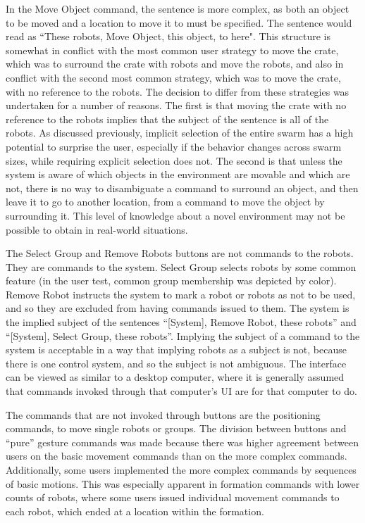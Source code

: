 In the Move Object command, the sentence is more complex, as both an object to be moved and a location to move it to must be specified. 
The sentence would read as ``These robots, Move Object, this object, to here". 
This structure is somewhat in conflict with the most common user strategy to move the crate, which was to surround the crate with robots and move the robots, and also in conflict with the second most common strategy, which was to move the crate, with no reference to the robots. 
The decision to differ from these strategies was undertaken for a number of reasons. 
The first is that moving the crate with no reference to the robots implies that the subject of the sentence is all of the robots. 
As discussed previously, implicit selection of the entire swarm has a high potential to surprise the user, especially if the behavior changes across swarm sizes, while requiring explicit selection does not. 
The second is that unless the system is aware of which objects in the environment are movable and which are not, there is no way to disambiguate a command to surround an object, and then leave it to go to another location, from a command to move the object by surrounding it.
This level of knowledge about a novel environment may not be possible to obtain in real-world situations. 

The Select Group and Remove Robots buttons are not commands to the robots. 
They are commands to the system. 
Select Group selects robots by some common feature (in the user test, common group membership was depicted by color). 
Remove Robot instructs the system to mark a robot or robots as not to be used, and so they are excluded from having commands issued to them. 
The system is the implied subject of the sentences ``[System], Remove Robot, these robots'' and ``[System], Select Group, these robots''. 
Implying the subject of a command to the system is acceptable in a way that implying robots as a subject is not, because there is one control system, and so the subject is not ambiguous. 
The interface can be viewed as similar to a desktop computer, where it is generally assumed that commands invoked through that computer's UI are for that computer to do. 

The commands that are not invoked through buttons are the positioning commands, to move single robots or groups. 
The division between buttons and ``pure'' gesture commands was made because there was higher agreement between users on the basic movement commands than on the more complex commands. 
Additionally, some users implemented the more complex commands by sequences of basic motions. 
This was especially apparent in formation commands with lower counts of robots, where some users issued individual movement commands to each robot, which ended at a location within the formation. 

